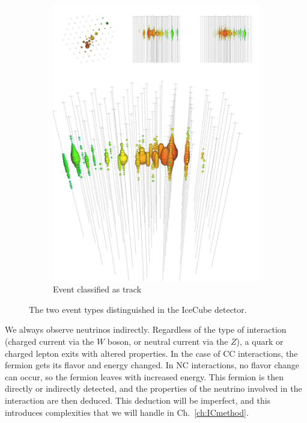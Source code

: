 \begin{figure}
\begin{center}
\begin{subfigure}{0.49\textwidth}
            \includegraphics[clip, trim=0cm 0cm 0cm 30cm, width=1\textwidth]{figures/track_event.pdf}
            \caption{Event classified as track} 
            \label{fig:events_track}
        \end{subfigure}
        \caption{The two event types distinguished in the IceCube detector.}
    \end{center}
\end{figure}
We always observe neutrinos indirectly.
Regardless of the type of interaction (charged current via the $W$ boson, or neutral current
via the $Z$), a quark or charged lepton exits with altered properties. In the case of CC interactions, the fermion
gets its flavor and energy changed. In NC interactions, no flavor change can occur, so the fermion leaves with increased energy.
This fermion is then directly or indirectly detected, 
and the properties of the neutrino involved in the 
interaction are then deduced. This deduction will be imperfect, and this introduces complexities that we will handle in Ch.~\ref{ch:ICmethod}. 


